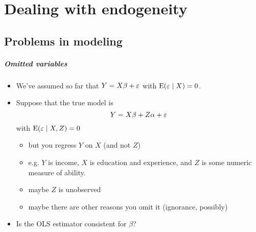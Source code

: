 

\chapter{Dealing with endogeneity}

\section{Problems in modeling}

\paragraph{Omitted variables}
\begin{itemize}
\item We've assumed so far that $Y = X\beta + \varepsilon$ with $\operatorname{E}(\varepsilon \mid X) = 0$.
\item Suppose that the true model is
  \[Y = X\beta + Z\alpha + \varepsilon\] with $\operatorname{E}(\varepsilon \mid X, Z) = 0$
\begin{itemize}
\item but you regress $Y$ on $X$ (and not $Z$)
\item e.g. $Y$ is income, $X$ is education and experience, and
          $Z$ is some numeric measure of ability.
\item maybe $Z$ is unobserved
\item maybe there are other reasons you omit it (ignorance, possibly)
\end{itemize}
\item Is the OLS estimator consistent for $\beta$?
\end{itemize}

